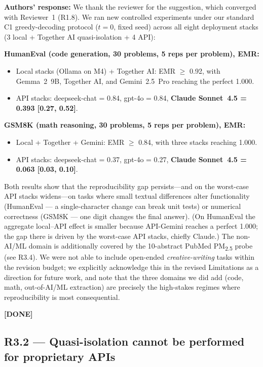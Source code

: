 \documentclass[11pt,a4paper]{article}
\newcommand{\response}[1]{\par\noindent\textbf{\color{revgreen}Authors' response:} #1\par}
\newcommand{\done}{\color{revgreen}\textbf{[DONE]}}
\begin{document}
\response{We thank the reviewer for the suggestion, which converged with Reviewer~1 (R1.8). We ran new controlled experiments under our standard C1 greedy-decoding protocol ($t{=}0$, fixed seed) across all eight deployment stacks (3 local + Together AI quasi-isolation + 4 API):

\textbf{HumanEval (code generation, 30 problems, 5 reps per problem), EMR:}
\begin{itemize}[leftmargin=*]
  \item Local stacks (Ollama on M4) + Together AI: EMR $\geq$ 0.92, with Gemma~2~9B, Together AI, and Gemini~2.5~Pro reaching the perfect 1.000.
  \item API stacks: deepseek-chat = 0.84, gpt-4o = 0.84, \textbf{Claude Sonnet~4.5 = 0.393 [0.27, 0.52]}.
\end{itemize}

\textbf{GSM8K (math reasoning, 30 problems, 5 reps per problem), EMR:}
\begin{itemize}[leftmargin=*]
  \item Local + Together + Gemini: EMR $\geq$ 0.84, with three stacks reaching 1.000.
  \item API stacks: deepseek-chat = 0.37, gpt-4o = 0.27, \textbf{Claude Sonnet~4.5 = 0.063 [0.03, 0.10]}.
\end{itemize}

Both results show that the reproducibility gap persists---and on the worst-case API stacks widens---on tasks where small textual differences alter functionality (HumanEval --- a single-character change can break unit tests) or numerical correctness (GSM8K --- one digit changes the final answer). (On HumanEval the aggregate local--API effect is smaller because API-Gemini reaches a perfect 1.000; the gap there is driven by the worst-case API stacks, chiefly Claude.) The non-AI/ML domain is additionally covered by the 10-abstract PubMed PM\textsubscript{2.5} probe (see R3.4). We were not able to include open-ended \emph{creative-writing} tasks within the revision budget; we explicitly acknowledge this in the revised Limitations as a direction for future work, and note that the three domains we did add (code, math, out-of-AI/ML extraction) are precisely the high-stakes regimes where reproducibility is most consequential.} \done

\subsection*{R3.2 --- Quasi-isolation cannot be performed for proprietary APIs}
\end{document}
